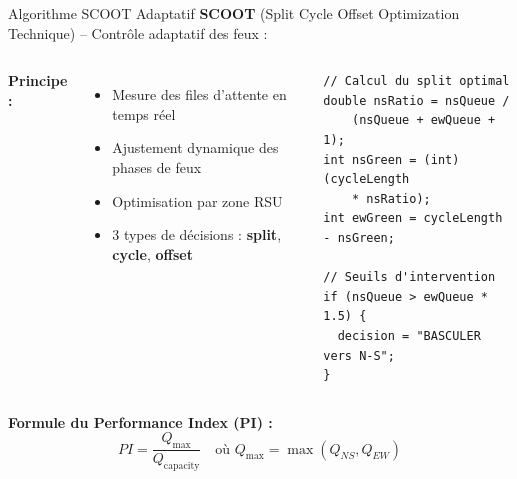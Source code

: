 \documentclass[10pt,aspectratio=169]{beamer}
\begin{document}
\begin{frame}[fragile]{Algorithme SCOOT Adaptatif}
\textbf{SCOOT} (Split Cycle Offset Optimization Technique) -- Contr\^ole adaptatif des feux :

\begin{columns}
\textbf{Principe :}
\begin{itemize}
    \item Mesure des files d'attente en temps r\'eel
    \item Ajustement dynamique des phases de feux
    \item Optimisation par zone RSU
    \item 3 types de d\'ecisions : \textbf{split}, \textbf{cycle}, \textbf{offset}
\end{itemize}

\begin{lstlisting}[style=java, title={SCOOTController.java}]
// Calcul du split optimal
double nsRatio = nsQueue / 
    (nsQueue + ewQueue + 1);
int nsGreen = (int)(cycleLength 
    * nsRatio);
int ewGreen = cycleLength - nsGreen;

// Seuils d'intervention
if (nsQueue > ewQueue * 1.5) {
  decision = "BASCULER vers N-S";
}
\end{lstlisting}
\end{columns}

\vspace{0.2cm}
\textbf{Formule du Performance Index (PI) :}
\begin{equation}
PI = \frac{Q_{\text{max}}}{Q_{\text{capacity}}} \quad \text{o\`u } Q_{\text{max}} = \max(Q_{NS}, Q_{EW})
\end{equation}
\end{frame}
\end{document}
